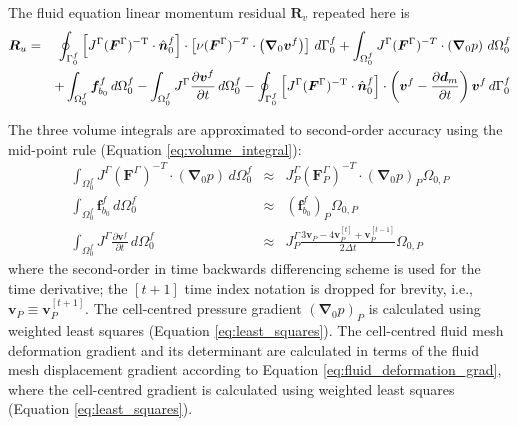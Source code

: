 \documentclass[sn-mathphys,Numbered]{sn-jnl}%
\newcommand{\bb}{\boldsymbol}
\begin{document}
The fluid equation linear momentum residual $\bb{R}_v$ repeated here is
\begin{eqnarray}
    \bb{R}_u %
    &=&
	\oint_{\Gamma^f_0}  \left[ J^\Gamma (\bb{F}^\Gamma)^{-\text{T}} \cdot \hat{\bb{n}}_0^f \right]
		\cdot \left[\nu (\bb{F}^\Gamma)^{-T} \cdot \left( \bb{\nabla}_0 \bb{v}^f \right) \right] \, d\Gamma^f_0
	+ \int_{\Omega^f_0} J^\Gamma (\bb{F}^\Gamma)^{-T} \cdot \left( \bb{\nabla}_0 p \right) \, d\Omega^f_0 \notag \\
	&&+ \int_{\Omega^f_0} \bb{f}_{b_0}^f \, d\Omega^f_0
	- \int_{\Omega^f_0} J^\Gamma \frac{\partial \bb{v}^f}{\partial t} \, d\Omega^f_0 
	- \oint_{\Gamma^f_0}  \left[ J^\Gamma (\bb{F}^\Gamma)^{-\text{T}} \cdot \hat{\bb{n}}_0^f \right] \cdot \left(\bb{v}^f - \frac{\partial \bb{d}_m}{\partial t}\right) \bb{v}^f \, d\Gamma^f_0
\end{eqnarray}

The three volume integrals are approximated to second-order accuracy using the mid-point rule (Equation \ref{eq:volume_integral}):
\begin{eqnarray}
	\int_{\Omega^f_0} J^\Gamma (\bb{F}^\Gamma)^{-T} \cdot \left( \bb{\nabla}_0 p \right) \, d\Omega^f_0
		&\approx& J^\Gamma_P (\bb{F}^\Gamma_P)^{-T} \cdot \left( \bb{\nabla}_0 p \right)_P  \Omega_{0,P} \\
	\int_{\Omega^f_0} \bb{f}_{b_0}^f \, d\Omega^f_0	&\approx&		\left( \bb{f}_{b_0}^f \right)_P  \Omega_{0,P} \\
	\int_{\Omega^f_0} J^\Gamma \frac{\partial \bb{v}^f}{\partial t} \, d\Omega^f_0
		&\approx& 	J^\Gamma_P  \frac{3 \bb{v}_P - 4 \bb{v}_P^{[t]} + \bb{v}_P^{[t-1]}}{2\Delta t}  \Omega_{0,P}
\end{eqnarray}
where the second-order in time backwards differencing scheme is used for the time derivative;
the $[t+1]$ time index notation is dropped for brevity, i.e., $\bb{v}_P  \equiv \bb{v}_P^{[t+1]}$.
The cell-centred pressure gradient $\left( \bb{\nabla}_0 p \right)_P$ is calculated using weighted least squares (Equation \ref{eq:least_squares}).
The cell-centred fluid mesh deformation gradient and its determinant are calculated in terms of the fluid mesh displacement gradient according to Equation \ref{eq:fluid_deformation_grad}, where the cell-centred gradient is calculated using weighted least squares (Equation \ref{eq:least_squares}).
\end{document}
